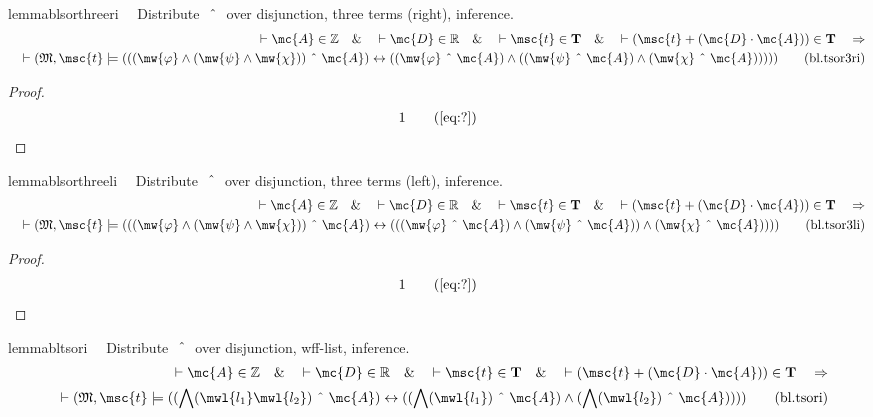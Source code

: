 \begin{restatable}{lemma}{blsorthreeri}~~ Distribute $~\string^~$ over
disjunction, three terms (right), inference.
\begin{align}
\vdash \mc{A} \in \mathbb{Z}\quad\&\quad \vdash \mc{D} \in
    \mathbb{R}\quad\&\quad \vdash \msc{t} \in \mathbf{T}\quad\&\quad \vdash (
    \msc{t} + ( \mc{D} \cdot \mc{A} ) ) \in \mathbf{T}\quad\Rightarrow \notag \\ 
	\quad
    \vdash ( \mathfrak{M} , \msc{t} \models ( ( ( \mw{\varphi} \wedge (
    \mw{\psi} \wedge \mw{\chi} ) ) ~\string^~ \mc{A} ) \leftrightarrow ( (
    \mw{\varphi} ~\string^~ \mc{A} ) \wedge ( ( \mw{\psi} ~\string^~ \mc{A} )
    \wedge ( \mw{\chi} ~\string^~ \mc{A} ) ) ) )
    )\label{eq:bl.tsor3ri}\tag{bl.tsor3ri}
\end{align}
\end{restatable}

\begin{proof}
\begin{align}
  1 &&  & &(\mbox{\ref{eq:?}})\notag
\end{align}
\end{proof}

\begin{restatable}{lemma}{blsorthreeli}~~ Distribute $~\string^~$ over
disjunction, three terms (left), inference.
\begin{align}
\vdash \mc{A} \in \mathbb{Z}\quad\&\quad \vdash \mc{D} \in
    \mathbb{R}\quad\&\quad \vdash \msc{t} \in \mathbf{T}\quad\&\quad \vdash (
    \msc{t} + ( \mc{D} \cdot \mc{A} ) ) \in \mathbf{T}\quad\Rightarrow \notag \\ 
	\quad
    \vdash ( \mathfrak{M} , \msc{t} \models ( ( ( \mw{\varphi} \wedge (
    \mw{\psi} \wedge \mw{\chi} ) ) ~\string^~ \mc{A} ) \leftrightarrow ( ( (
    \mw{\varphi} ~\string^~ \mc{A} ) \wedge ( \mw{\psi} ~\string^~ \mc{A} ) )
    \wedge ( \mw{\chi} ~\string^~ \mc{A} ) ) )
    )\label{eq:bl.tsor3li}\tag{bl.tsor3li}
\end{align}
\end{restatable}

\begin{proof}
\begin{align}
  1 &&  & &(\mbox{\ref{eq:?}})\notag
\end{align}
\end{proof}

\begin{restatable}{lemma}{bltsori}~~ Distribute $~\string^~$ over disjunction,
wff-list, inference.
\begin{align}
\vdash \mc{A} \in \mathbb{Z}\quad\&\quad \vdash \mc{D} \in
    \mathbb{R}\quad\&\quad \vdash \msc{t} \in \mathbf{T}\quad\&\quad \vdash (
    \msc{t} + ( \mc{D} \cdot \mc{A} ) ) \in \mathbf{T}\quad\Rightarrow \notag \\ 
	\quad
    \vdash ( \mathfrak{M} , \msc{t} \models ( ( \bigwedge( \mwl{l_1} \mwl{l_2}
    ) ~\string^~ \mc{A} ) \leftrightarrow ( ( \bigwedge( \mwl{l_1} ) ~\string^~
    \mc{A} ) \wedge ( \bigwedge( \mwl{l_2} ) ~\string^~ \mc{A} ) ) )
    )\label{eq:bl.tsori}\tag{bl.tsori}
\end{align}
\end{restatable}

